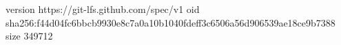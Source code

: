 version https://git-lfs.github.com/spec/v1
oid sha256:f44d04fc6bbcb9930e8c7a0a10b1040fdeff3c6506a56d906539ae18ce9b7388
size 349712
